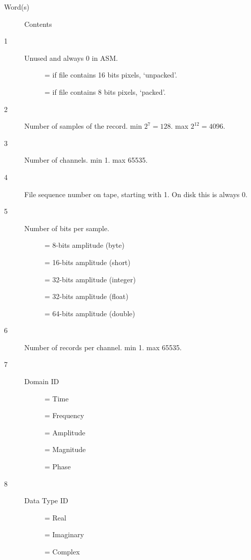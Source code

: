 \documentclass{report}
\begin{document}
\begin{description}
\item[Word(s)] Contents
\item[1] Unused and always 0 in ASM.
         \begin{description}
             \item[] = if file contains 16 bits pixels, `unpacked'.
             \item[] = if file contains 8 bits pixels, `packed'.
	     \end{description}
\item[2] Number of samples of the record. min $2^{7}=128$. max $2^{12}=4096$.
\item[3] Number of channels. min 1. max 65535.
\item[4] File sequence number on tape, starting with 1. On disk this is
             always 0.
\item[5] Number of bits per sample.
         \begin{description}
             \item[]    = 8-bits amplitude (byte)
			 \item[]   = 16-bits amplitude (short)
			 \item[]   = 32-bits amplitude (integer)
			 \item[] = 32-bits amplitude (float)
			 \item[] = 64-bits amplitude (double)
	     \end{description}
\item[6] Number of records per channel. min 1. max 65535.
\item[7] Domain ID
         \begin{description}
             \item[]   = Time
			 \item[]   = Frequency
			 \item[]   = Amplitude
			 \item[]   = Magnitude
			 \item[]   = Phase
	     \end{description}
\item[8] Data Type ID
         \begin{description}
             \item[]   = Real
			 \item[]   = Imaginary
			 \item[]   = Complex
	     \end{description}

\end{description}
\end{document}
